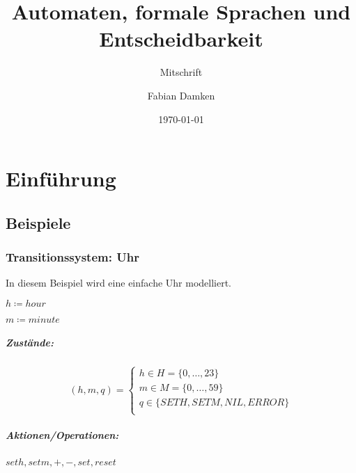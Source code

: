 \documentclass[12pt]{scrreprt}
\title{Automaten, formale Sprachen und Entscheidbarkeit}
\subtitle{Mitschrift}
\author{Fabian Damken}
\date{\today}
\begin{document}
    \maketitle
    \tableofcontents

    \chapter{Einführung}
        \label{c:einfuehrung}

        \section{Beispiele}
            \label{s:einfuehrung_beispiel}

            \subsection{Transitionssystem: Uhr}
                \label{ss:einfiehrung_beispiel_uhr}

                In diesem Beispiel wird eine einfache Uhr modelliert.

                $ h \coloneqq hour $

                $ m \coloneqq minute $

                \paragraph{Zustände:}

                    \begin{equation}
                        (h, m, q) =
                        \begin{cases}
                            h \in H = \{ 0, \dots, 23 \}        \\
                            m \in M = \{ 0, \dots, 59 \}        \\
                            q \in \{ SETH, SETM, NIL, ERROR \}  \\
                        \end{cases}
                    \end{equation}


                \paragraph{Aktionen/Operationen:}

                    $ seth, setm, +, -, set, reset $
\end{document}
